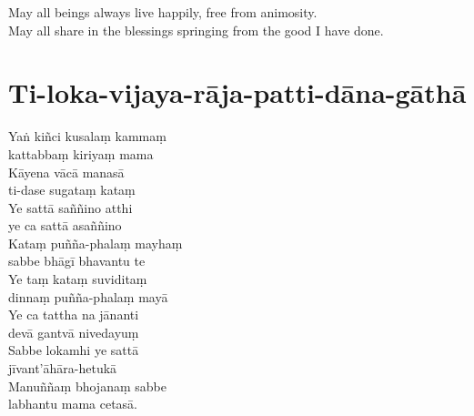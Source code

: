 \begin{english}
  May all beings always live happily, free from animosity.\\
  May all share in the blessings springing from the good I have done.
\end{english}

\clearpage

\section{Ti-loka-vijaya-rāja-patti-dāna-gāthā}


Yaṅ kiñci kusalaṃ kammaṃ\\
\vin kattabbaṃ kiriyaṃ mama\\
Kāyena vācā manasā\\
\vin ti-dase sugataṃ kataṃ\\
Ye sattā saññino atthi\\
\vin ye ca sattā asaññino\\
Kataṃ puñña-phalaṃ mayhaṃ\\
\vin sabbe bhāgī bhavantu te\\
Ye taṃ kataṃ suviditaṃ\\
\vin dinnaṃ puñña-phalaṃ mayā\\
Ye ca tattha na jānanti\\
\vin devā gantvā nivedayuṃ\\
Sabbe lokamhi ye sattā\\
\vin jīvant'āhāra-hetukā\\
Manuññaṃ bhojanaṃ sabbe\\
\vin labhantu mama cetasā.



